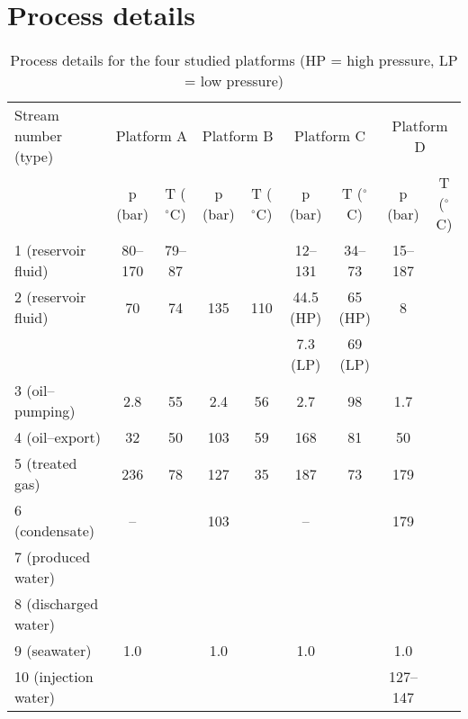 
\appendix 

\section{Process details}

\begin{table*}[htbp]
  \centering
  \scriptsize
  \caption{Process details for the four studied platforms (HP = high pressure, LP = low pressure)}
    \begin{tabular*}{\linewidth}{@{\extracolsep{\fill}}lcccccccc}
    \toprule
    Stream number (type)  & \multicolumn{2}{c}{Platform A} & \multicolumn{2}{c}{Platform B} & \multicolumn{2}{c}{Platform C} & \multicolumn{2}{c}{Platform D} \\
     & p (bar) & T ($^{\circ}$C) & p (bar) & T ($^{\circ}$C) & p (bar) & T ($^{\circ}$C) & p (bar) & T ($^{\circ}$C) \\
	 \toprule
	 1 (reservoir fluid)  & 80--170 & 79--87 &       &       & 12--131 & 34--73 & 15--187   &  \\
    2 (reservoir fluid)    & 70    & 74    & 135   & 110   & 44.5 (HP) & 65 (HP) & 8     &  \\
		  &		   & 		  &			&			& 7.3 (LP) & 69 (LP)  & & \\
    3 (oil--pumping)   & 2.8   & 55    & 2.4   & 56    & 2.7   & 98    & 1.7   &  \\
    4 (oil--export)    & 32    & 50    & 103   & 59    & 168   & 81    & 50    &  \\
    5 (treated gas)    & 236   & 78    & 127   & 35    & 187   & 73    & 179   &  \\
    6 (condensate)    &   --    &       &  103     &       &  --     &       & 179      &  \\
    7 (produced water)    &       &       &       &       &       &       &       &  \\
    8 (discharged water)    &       &       &       &       &       &       &       &  \\
    9 (seawater)    & 1.0      &       & 1.0      &       &   1.0    &       & 1.0     &  \\
    10 (injection water)   &       &       &       &       &       &       & 127--147      &  \\
    \bottomrule
    \end{tabular*}%
  \label{tab:process_details}%
\end{table*}%

